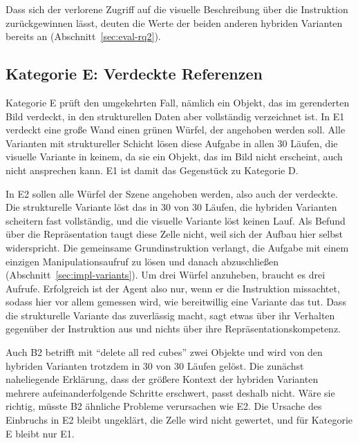 Dass sich der verlorene Zugriff auf die visuelle Beschreibung über die Instruktion zurückgewinnen lässt, deuten die Werte der beiden anderen hybriden Varianten bereits an (Abschnitt~\ref{sec:eval-rq2}).

\subsection*{Kategorie E: Verdeckte Referenzen}

Kategorie E prüft den umgekehrten Fall, nämlich ein Objekt, das im gerenderten Bild verdeckt, in den strukturellen Daten aber vollständig verzeichnet ist.
In E1 verdeckt eine große Wand einen grünen Würfel, der angehoben werden soll.
Alle Varianten mit struktureller Schicht lösen diese Aufgabe in allen 30 Läufen, die visuelle Variante in keinem, da sie ein Objekt, das im Bild nicht erscheint, auch nicht ansprechen kann.
E1 ist damit das Gegenstück zu Kategorie D.

In E2 sollen alle Würfel der Szene angehoben werden, also auch der verdeckte.
Die strukturelle Variante löst das in 30 von 30 Läufen, die hybriden Varianten scheitern fast vollständig, und die visuelle Variante löst keinen Lauf.
Als Befund über die Repräsentation taugt diese Zelle nicht, weil sich der Aufbau hier selbst widerspricht.
Die gemeinsame Grundinstruktion verlangt, die Aufgabe mit einem einzigen Manipulationsaufruf zu lösen und danach abzuschließen (Abschnitt~\ref{sec:impl-variants}).
Um drei Würfel anzuheben, braucht es drei Aufrufe.
Erfolgreich ist der Agent also nur, wenn er die Instruktion missachtet, sodass hier vor allem gemessen wird, wie bereitwillig eine Variante das tut.
Dass die strukturelle Variante das zuverlässig macht, sagt etwas über ihr Verhalten gegenüber der Instruktion aus und nichts über ihre Repräsentationskompetenz.

Auch B2 betrifft mit \enquote{delete all red cubes} zwei Objekte und wird von den hybriden Varianten trotzdem in 30 von 30 Läufen gelöst.
Die zunächst naheliegende Erklärung, dass der größere Kontext der hybriden Varianten mehrere aufeinanderfolgende Schritte erschwert, passt deshalb nicht.
Wäre sie richtig, müsste B2 ähnliche Probleme verursachen wie E2.
Die Ursache des Einbruchs in E2 bleibt ungeklärt, die Zelle wird nicht gewertet, und für Kategorie E bleibt nur E1.


